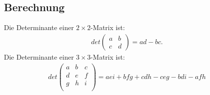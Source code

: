 \documentclass{report}
\begin{document}
\subsection{Berechnung}
Die Determinante einer $2 \times 2$-Matrix ist:
\begin{align*}
 det \begin{pmatrix}
      a & b\\
      c & d
     \end{pmatrix}
    = ad - bc.
\end{align*}
Die Determinante einer $3 \times 3$-Matrix ist:
\begin{align*}
det \begin{pmatrix}
     a & b & c\\
     d & e & f\\
     g & h & i\\
    \end{pmatrix}
    = aei + bfg + cdh - ceg - bdi - afh
\end{align*}
%
%
\end{document}
